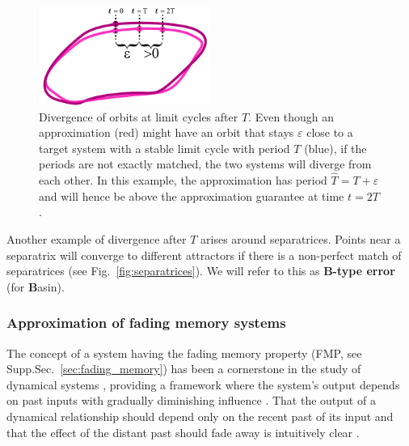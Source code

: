 \documentclass{article}
\newcounter{ct}
\begin{document}
\setlength\belowcaptionskip{-5ex}
\begin{figure}
  \centering
  \includegraphics[width=0.5\textwidth]{lc_period_div}
  \caption{Divergence of orbits at limit cycles after $T$.
  Even though an approximation (red) might have an orbit that stays $\varepsilon$ close to a target system with a stable limit cycle with period $T$ (blue), if the periods are not exactly matched, the two systems will diverge from each other.
  In this example, the approximation has period $\hat{T} = T+\varepsilon$ and will hence be above the approximation guarantee at time $t=2T$.
  }\label{fig:lc_period_div}
\end{figure}

Another example of divergence after $T$ arises around separatrices.
Points near a separatrix will converge to different attractors if there is a non-perfect match of separatrices (see Fig.~\ref{fig:separatrices}).
We will refer to this as \textbf{B-type error} (for \textbf{B}asin).



\subsubsection{Approximation of fading memory systems}\label{sec:fadingmemory}
The concept of a system having the fading memory property (FMP, see Supp.Sec.~\ref{sec:fading_memory}) has been a cornerstone in the study of dynamical systems \citep{coleman1968general}, providing a framework where the system’s output depends on past inputs with gradually diminishing influence  \citep{boyd1985fading}.
That the output of a dynamical relationship should depend only on the recent past of its input and that the effect of the distant past should fade away is intuitively clear   \citep{sepulchre2021fading}.
\end{document}
